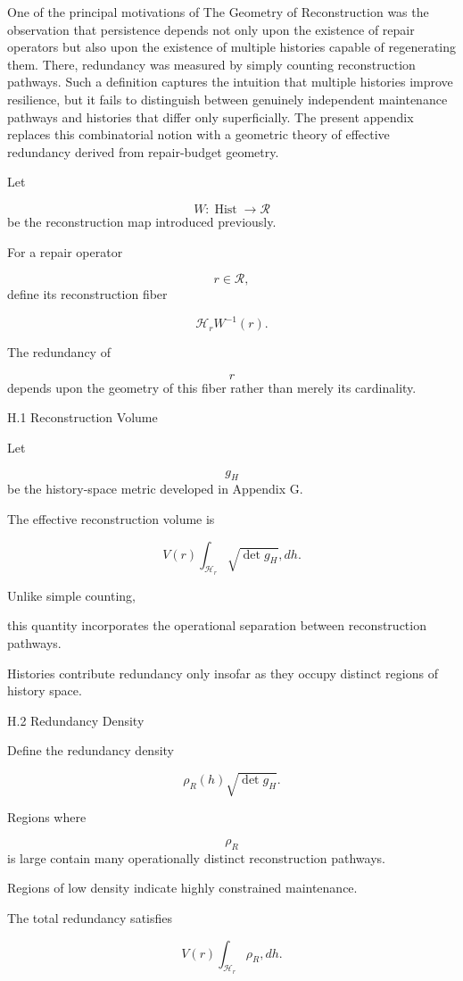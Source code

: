\documentclass[12pt,oneside]{article}
\theoremstyle{plain}
\theoremstyle{definition}
\theoremstyle{remark}
\DeclareMathOperator{\Hist}{Hist}
\begin{document}
One of the principal motivations of The Geometry of Reconstruction was the observation that persistence depends not only upon the existence of repair operators but also upon the existence of multiple histories capable of regenerating them. There, redundancy was measured by simply counting reconstruction pathways. Such a definition captures the intuition that multiple histories improve resilience, but it fails to distinguish between genuinely independent maintenance pathways and histories that differ only superficially. The present appendix replaces this combinatorial notion with a geometric theory of effective redundancy derived from repair-budget geometry.

Let

\[
W:\Hist\rightarrow\mathcal R
\]
be the reconstruction map introduced previously.

For a repair operator

\[
r\in\mathcal R,
\]
define its reconstruction fiber

\[
\mathcal H_r
W^{-1}(r).
\]

The redundancy of

\[
r
\]
depends upon the geometry of this fiber rather than merely its cardinality.


H.1 Reconstruction Volume

Let

\[
g_H
\]
be the history-space metric developed in Appendix G.

The effective reconstruction volume is

\[
V(r)
\int_{\mathcal H_r}
\sqrt{\det g_H}
,dh.
\]

Unlike simple counting,

this quantity incorporates the operational separation between reconstruction pathways.

Histories contribute redundancy only insofar as they occupy distinct regions of history space.


H.2 Redundancy Density

Define the redundancy density

\[
\rho_R(h)
\sqrt{\det g_H}.
\]

Regions where

\[
\rho_R
\]
is large contain many operationally distinct reconstruction pathways.

Regions of low density indicate highly constrained maintenance.

The total redundancy satisfies

\[
V(r)
\int_{\mathcal H_r}
\rho_R
,dh.
\]
\end{document}
